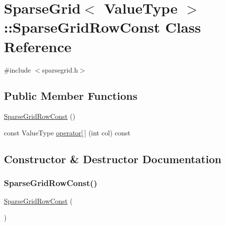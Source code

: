 \hypertarget{classSparseGrid_1_1SparseGridRowConst}{}\section{Sparse\+Grid$<$ Value\+Type $>$\+:\+:Sparse\+Grid\+Row\+Const Class Reference}
\label{classSparseGrid_1_1SparseGridRowConst}


{\ttfamily \#include $<$sparsegrid.\+h$>$}

\subsection*{Public Member Functions}
\begin{DoxyCompactItemize}
\item 
\mbox{\hyperlink{classSparseGrid_1_1SparseGridRowConst_a6e1d4cdf37043e6585ea743f86c54b80}{Sparse\+Grid\+Row\+Const}} ()
\item 
const Value\+Type \mbox{\hyperlink{classSparseGrid_1_1SparseGridRowConst_a3dc8d98145632fca91f860f4f720e219}{operator\mbox{[}$\,$\mbox{]}}} (int col) const
\end{DoxyCompactItemize}


\subsection{Constructor \& Destructor Documentation}
\mbox{\label{classSparseGrid_1_1SparseGridRowConst_a6e1d4cdf37043e6585ea743f86c54b80}} 
\subsubsection{\texorpdfstring{Sparse\+Grid\+Row\+Const()}{SparseGridRowConst()}}
{\footnotesize\ttfamily \mbox{\hyperlink{classSparseGrid_1_1SparseGridRowConst}{Sparse\+Grid\+Row\+Const}} (\begin{DoxyParamCaption}{ }\end{DoxyParamCaption})\hspace{0.3cm}{\ttfamily [inline]}}



